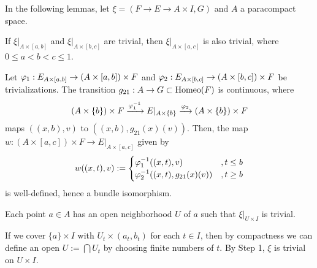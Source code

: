 \documentclass{../../../small}
\begin{document}
In the following lemmas, let $\xi=(F\to E\to A\times I,G)$ and $A$ a paracompact space.
\begin{lem*}[Step 1 of 3.2]
If $\xi|_{A\times[a,b]}$ and $\xi|_{A\times[b,c]}$ are trivial, then $\xi|_{A\times[a,c]}$ is also trivial, where $0\le a<b<c\le1$.
\end{lem*}
\begin{pf}
Let $\varphi_1:E_{A\times[a,b]}\to(A\times[a,b])\times F$ and $\varphi_2:E_{A\times[b,c]}\to(A\times[b,c])\times F$ be trivializations.
The transition $g_{21}:A\to G\subset\operatorname{Homeo}(F)$ is continuous, where
\[(A\times\{b\})\times F\xrightarrow{\varphi_1^{-1}}E|_{A\times\{b\}}\xrightarrow{\varphi_2}(A\times\{b\})\times F\]
maps $((x,b),v)$ to $((x,b),g_{21}(x)(v))$.
Then, the map $w:(A\times[a,c])\times F\to E|_{A\times[a,c]}$ given by
\[w((x,t),v):=\begin{cases}\varphi_1^{-1}((x,t),v)&,t\le b\\\varphi_2^{-1}((x,t),g_{21}(x)(v))&,t\ge b\end{cases}\]
is well-defined, hence a bundle isomorphism.
\end{pf}

\begin{lem*}[Step 2 of 3.2]
Each point $a\in A$ has an open neighborhood $U$ of $a$ such that $\xi|_{U\times I}$ is trivial.
\end{lem*}
\begin{pf}
If we cover $\{a\}\times I$ with $U_t\times(a_t,b_t)$ for each $t\in I$, then by compactness we can define an open $U:=\bigcap U_t$ by choosing finite numbers of $t$.
By Step 1, $\xi$ is trivial on $U\times I$.
\end{pf}
\end{document}
